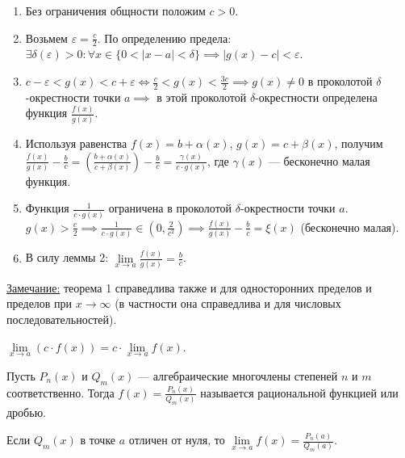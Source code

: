 \documentclass{article}
\begin{document}
\begin{enumerate}
    \item Без ограничения общности положим \(c > 0\).
    \item Возьмем \(\displaystyle \varepsilon = \frac{c}{2}\). По определению предела: \(\exists \delta(\varepsilon) > 0 : \forall x \in \{0 < \vert x - a \vert < \delta\} \implies \vert g(x) - c \vert < \varepsilon\).
    \item \(\displaystyle c - \varepsilon < g(x) < c + \varepsilon \iff \frac{c}{2} < g(x) < \frac{3c}{2} \implies g(x) \neq 0\) в проколотой \(\delta\)-окрестности точки \(a \implies \) в этой проколотой \(\delta\)-окрестности определена функция \(\displaystyle \frac{f(x)}{g(x)}\).
    \item Используя равенства \(f(x) = b + \alpha(x)\), \(g(x) = c + \beta(x)\), получим \(\displaystyle \frac{f(x)}{g(x)} - \frac{b}{c} = \left(\frac{b + \alpha(x)}{c + \beta(x)}\right) - \frac{b}{c} = \frac{\gamma(x)}{c \cdot g(x)}\), где \(\gamma(x)\) --- бесконечно малая функция.
    \item Функция \(\displaystyle \frac{1}{c \cdot g(x)}\) ограничена в проколотой \(\delta\)-окрестности точки \(a\). \(\displaystyle g(x) > \frac{c}{2} \implies \frac{1}{c \cdot g(x)} \in \left(0, \frac{2}{c^2}\right) \implies \frac{f(x)}{g(x)} - \frac{b}{c} = \xi(x)\) (бесконечно малая).
    \item В силу леммы 2: \(\displaystyle \lim\limits_{x \to a}\frac{f(x)}{g(x)} = \frac{b}{c}\).    
\end{enumerate} 
\noindent
\underline{Замечание:} теорема 1 справедлива также и для односторонних пределов и пределов при \(x \to \infty\) (в частности она справедлива и для числовых последовательностей).\\
\begin{claim}
    \(\lim\limits_{x \to a}(c \cdot f(x)) = c \cdot \lim\limits_{x \to a}f(x)\).
\end{claim}

\begin{definition}
    Пусть \(P_{n}(x)\) и \(Q_{m}(x)\) --- алгебраические многочлены степеней \(n\) и \(m\) соответственно. Тогда \(\displaystyle f(x) = \frac{P_{n}(x)}{Q_{m}(x)}\) называется рациональной функцией или дробью.  
\end{definition}

\begin{claim}
    Если \(Q_{m}(x)\) в точке \(a\) отличен от нуля, то \(\displaystyle \lim\limits_{x \to a}f(x) = \frac{P_{n}(a)}{Q_{m}(a)}\).   
\end{claim}
\end{document}
